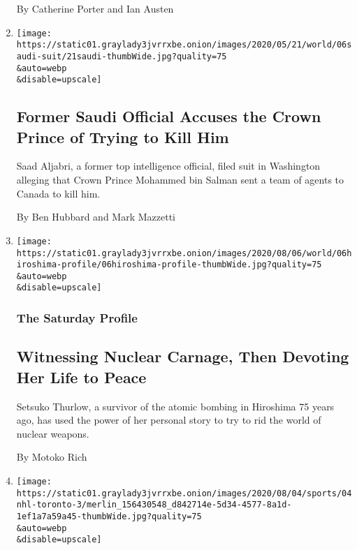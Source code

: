 \begin{enumerate}
  By Catherine Porter and Ian Austen
\item
  \href{/2020/08/06/world/middleeast/saudi-prince-mohammed-lawsuit-aljabri.html}{}

  \texttt{[image: https://static01.graylady3jvrrxbe.onion/images/2020/05/21/world/06saudi-suit/21saudi-thumbWide.jpg?quality=75\\\&auto=webp\\\&disable=upscale]}

  \hypertarget{former-saudi-official-accuses-the-crown-prince-of-trying-to-kill-him}{%
  \subsection{Former Saudi Official Accuses the Crown Prince of Trying
  to Kill
  Him}\label{former-saudi-official-accuses-the-crown-prince-of-trying-to-kill-him}}

  Saad Aljabri, a former top intelligence official, filed suit in
  Washington alleging that Crown Prince Mohammed bin Salman sent a team
  of agents to Canada to kill him.

  By Ben Hubbard and Mark Mazzetti
\item
  \href{/2020/08/06/world/asia/hiroshima-japan-setsuko-thurlow.html}{}

  \texttt{[image: https://static01.graylady3jvrrxbe.onion/images/2020/08/06/world/06hiroshima-profile/06hiroshima-profile-thumbWide.jpg?quality=75\\\&auto=webp\\\&disable=upscale]}

  \hypertarget{the-saturday-profile}{%
  \subsubsection{The Saturday Profile}\label{the-saturday-profile}}

  \hypertarget{witnessing-nuclear-carnage-then-devoting-her-life-to-peace}{%
  \subsection{Witnessing Nuclear Carnage, Then Devoting Her Life to
  Peace}\label{witnessing-nuclear-carnage-then-devoting-her-life-to-peace}}

  Setsuko Thurlow, a survivor of the atomic bombing in Hiroshima 75
  years ago, has used the power of her personal story to try to rid the
  world of nuclear weapons.

  By Motoko Rich
\item
  \href{/2020/08/04/sports/toronto-nhl-playoffs.html}{}

  \texttt{[image: https://static01.graylady3jvrrxbe.onion/images/2020/08/04/sports/04nhl-toronto-3/merlin\_156430548\_d842714e-5d34-4577-8a1d-1ef1a7a59a45-thumbWide.jpg?quality=75\\\&auto=webp\\\&disable=upscale]}


\end{enumerate}
